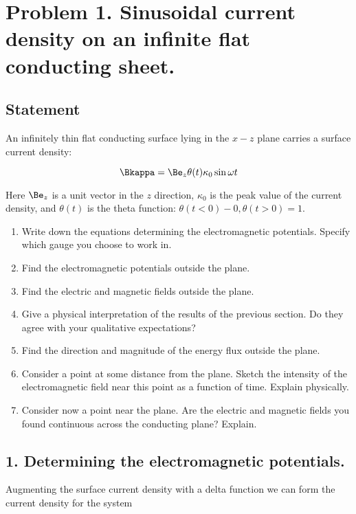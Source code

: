 \section{Problem 1.  Sinusoidal current density on an infinite flat conducting sheet.}
\subsection{Statement}

An infinitely thin flat conducting surface lying in the $x-z$ plane carries a surface current density:

\begin{equation}\label{eqn:relElectroDynProblemSet5P1:n}
\Bkappa = \Be_z \theta(t) \kappa_0 \sin\omega t
\end{equation}

Here $\Be_z$ is a unit vector in the $z$ direction, $\kappa_0$ is the peak value of the current density, and $\theta(t)$ is the theta function: $\theta(t < 0) - 0, \theta(t > 0) = 1$.

\begin{enumerate}
\item Write down the equations determining the electromagnetic potentials.  Specify which gauge you choose to work in.
\item Find the electromagnetic potentials outside the plane.
\item Find the electric and magnetic fields outside the plane.
\item Give a physical interpretation of the results of the previous section.  Do they agree with your qualitative expectations?
\item Find the direction and magnitude of the energy flux outside the plane.
\item Consider a point at some distance from the plane.  Sketch the intensity of the electromagnetic field near this point as a function of time.  Explain physically.
\item Consider now a point near the plane.  Are the electric and magnetic fields you found continuous across the conducting plane?  Explain.
\end{enumerate}

\subsection{1.  Determining the electromagnetic potentials.}

Augmenting the surface current density with a delta function we can form the current density for the system

